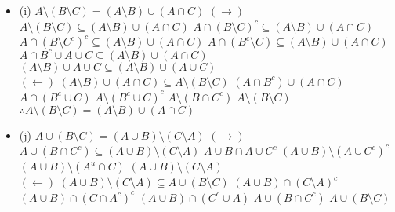 \begin{itemize}
	\item (i) $ A \setminus (B \setminus C) = (A \setminus B) \cup (A \cap C)$\newline
	$(\rightarrow)$\newline
	$ A \setminus (B \setminus C) \subseteq (A \setminus B) \cup (A \cap C)$\newline
	$ A \cap (B \setminus C)^c \subseteq (A \setminus B) \cup (A \cap C)$\newline
	$ A \cap (B \setminus C^c)^c \subseteq (A \setminus B) \cup (A \cap C)$\newline
	$ A \cap (B^c \setminus C) \subseteq (A \setminus B) \cup (A \cap C)$\newline
	$ A \cap B^c \cup A \cup C \subseteq (A \setminus B) \cup (A \cap C)$\newline
	$(A\setminus B) \cup A \cup C \subseteq ( A \setminus B) \cup (A \cup C)$\newline\\
	
	$(\leftarrow)$\newline
	$(A \setminus B) \cup (A \cap C) \subseteq A \setminus (B \setminus C)$\newline
	$(A \cap B ^c) \cup (A \cap C)$\newline
	$A \cap (B^c \cup C)$\newline
	$A \setminus (B^c \cup C)^c$\newline
	$A \setminus (B \cap C^c)$\newline
	$A \setminus (B \setminus C)$\newline
	$\therefore A \setminus (B \setminus C) = (A \setminus B) \cup (A \cap C)$
	
	
	\item (j) $A \cup (B \setminus C) = (A \cup B) \setminus (C \setminus A)$\newline
	$(\rightarrow)$\newline
	$A \cup (B \cap C^c) \subseteq (A \cup B )\setminus (C\setminus A)$\newline
	$A \cup B \cap A \cup C^c$\newline
	$(A \cup B) \setminus (A \cup C^c)^c$\newline
	$(A \cup B ) \setminus (A^u \cap C)$\newline
	$(A \cup B ) \setminus (C \setminus A)$\newline\\
	
	$(\leftarrow)$\newline
	$(A \cup B ) \setminus (C \setminus A) \subseteq A \cup (B \setminus C)$\newline
	$(A \cup B )\cap (C \setminus A)^c$\newline
	$(A \cup B )\cap (C \cap A^c)^c$\newline
	$(A \cup B )\cap (C ^c \cup A)$\newline
	$A \cup (B \cap C^c)$\newline
	$A \cup (B \setminus C)$
	
\end{itemize}